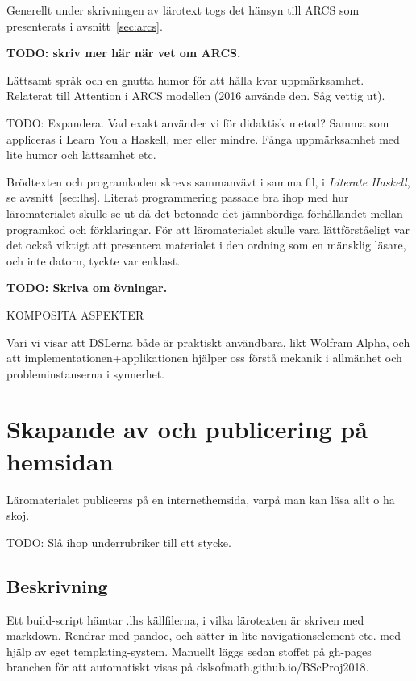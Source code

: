 \begin{binge}
Generellt under skrivningen av lärotext togs det hänsyn till ARCS som
presenterats i avsnitt~\ref{sec:arcs}. 

\textbf{TODO: skriv mer här när vet om ARCS.}

Lättsamt språk och en gnutta humor för att hålla kvar
uppmärksamhet. Relaterat till Attention i ARCS modellen (2016
använde den. Såg vettig ut).

TODO: Expandera. Vad exakt använder vi för didaktisk metod? Samma
som appliceras i Learn You a Haskell, mer eller mindre. Fånga
uppmärksamhet med lite humor och lättsamhet etc.

Brödtexten och programkoden skrevs sammanvävt i samma fil, i \textit{Literate
Haskell}, se avsnitt~\ref{sec:lhs}. Literat programmering passade bra ihop med
hur läromaterialet skulle se ut då det betonade det jämnbördiga förhållandet
mellan programkod och förklaringar. För att läromaterialet skulle vara
lättförståeligt var det också viktigt att presentera materialet i den ordning
som en mänsklig läsare, och inte datorn, tyckte var enklast.

\textbf{TODO: Skriva om övningar.}

KOMPOSITA ASPEKTER

Vari vi visar att DSLerna både är praktiskt användbara, likt Wolfram
Alpha, och att implementationen+applikationen hjälper oss förstå
mekanik i allmänhet och probleminstanserna i synnerhet.

\section{Skapande av och publicering på hemsidan}

  Läromaterialet publiceras på en internethemsida, varpå man kan läsa
  allt o ha skoj.

  TODO: Slå ihop underrubriker till ett stycke.

  \subsection{Beskrivning}

  Ett build-script hämtar .lhs källfilerna, i vilka lärotexten är
  skriven med markdown. Rendrar med pandoc, och sätter in lite
  navigationselement etc. med hjälp av eget templating-system. Manuellt
  läggs sedan stoffet på gh-pages branchen för att automatiskt visas på
  dslsofmath.github.io/BScProj2018. 


\end{binge}
